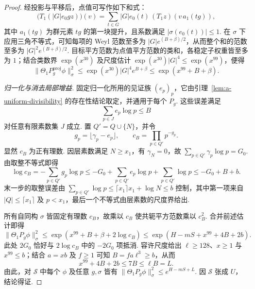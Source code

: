 \begin{proof}
经投影与平移后，点值可写作如下和式：
\[
 \bigl(T_1(|G|e_0gz)\bigr)(v)
   = \sum_{t\in G}|G| e_0(t)\,(T_1z)(v\,a_1(tg)),
\]
其中 $a_1(tg)$ 为群元素 $tg$ 的第一块提升，且系数满足 $|\sigma(e_0(t))|\le1$. 在 $\sigma$ 下应用三角不等式，可知每项的 Weyl 范数至多为 $|G|e^{(B+\beta)/2}$，从而整个和的范数至多为 $|G|^2e^{(B+\beta)/2}$. 目标平方范数为点值平方范数的类和，各稳定子权重皆至多为 $1$；结合类数界 $\exp(x^{30})$ 及尺度估计 $\exp(x^{30})|G|^4\le\exp(x^{99})$，便得
\[
 \|\Theta_1 P_g^{\mathrm{proj}}\phi\|_\sigma^2
 \le \exp(x^{30})|G|^4 e^{B+\beta}
 \le \exp(x^{99}+B+\beta).
\]

\emph{归一化与消去局部增益.}
固定归一化所用的见证族 $(e_p)_p$，它由引理~\ref{lem:a-uniform-divisibility} 的存在性结论取定，并通用于每个 $P_g$. 这些误差满足
\[
 \sum_{p\in J}e_p\log p\le B
\]
对任意有限素数集 $J$ 成立. 置 $Q'=Q\cup\{N\}$，并令
\[
 g_p=\lfloor\gamma_p-e_p\rfloor,\qquad c_B=\prod_{p\in Q'}p^{-g_p}.
\]
显然 $c_B$ 为正有理数. 因层素数满足 $N\ge x_1$，有 $\gamma_N=0$，故 $\sum_{p\in Q'}\gamma_p\log p=G_0$. 由取整不等式即得
\[
 \log c_B
 =-\sum_{p\in Q'}g_p\log p
 \le -G_0 +\sum_{p\in Q'}e_p\log p+\sum_{p\in Q'}\log p
 \le -G_0+B+b .
\]
末一步的取整误差由
$\sum_{p\in Q'}\log p\le\lceil x_1\rceil x_1+\log N\le b$ 控制，其中第一项来自 $|Q|\le\lceil x_1\rceil$ 及 $p<x_1$，最后一个不等式由层素数的尺度界给出.

所有自同构 $\sigma$ 皆固定有理数 $c_B$，故乘以 $c_B$ 使共轭平方范数乘以 $c_B^2$. 合并前述估计即得
\[
 \|\Theta_1P_g\phi\|_\sigma^2
 \le \exp(x^{99}+B+\beta+2\log c_B)
 \le \exp(H-mS+x^{99}+4B+2b).
\]
此处 $2G_0$ 恰好与 $2\log c_B$ 中的 $-2G_0$ 项抵消. 容许尺度给出 $\ell\ge128$、$x\ge1$ 与 $x^{99}\le b$；结合 $a=xb$ 及 $f\ge1$ 可知 $B=fa\ell^3\ge b$，从而
\[
 x^{99}+4B+2b\le7B\le\ell B=L .
\]
由此，对 $\mathcal S$ 中每个 $\phi$ 及任意 $g,\sigma$ 皆有 $\|\Theta_1P_g\phi\|_\sigma^2\le e^{H-mS+L}$. 因 $\mathcal S$ 张成 $U$，结论得证.
\end{proof}

